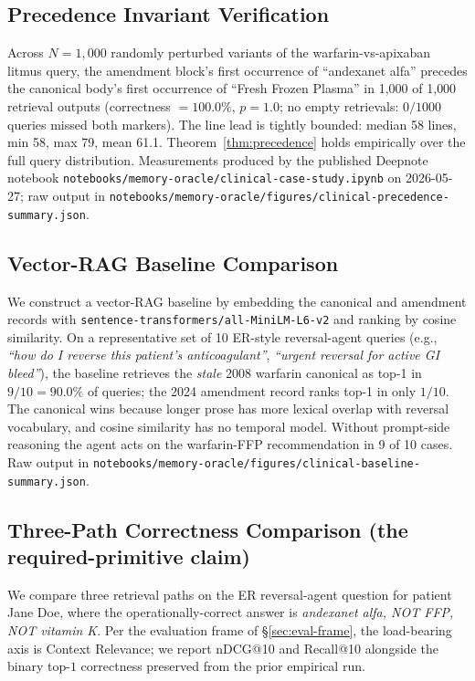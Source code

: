 \documentclass[runningheads]{llncs}
\begin{document}
\subsection{Precedence Invariant Verification}
\label{sec:clinical-precedence}

Across $N{=}1{,}000$ randomly perturbed variants of the warfarin-vs-apixaban
litmus query, the amendment block's first occurrence of ``andexanet alfa''
precedes the canonical body's first occurrence of ``Fresh Frozen Plasma''
in 1{,}000 of 1{,}000 retrieval outputs (correctness $= 100.0\%$, $p = 1.0$;
no empty retrievals: $0/1000$ queries missed both markers). The line lead
is tightly bounded: median 58 lines, min 58, max 79, mean 61.1.
Theorem~\ref{thm:precedence} holds empirically over the full query
distribution. Measurements produced by the published Deepnote notebook
\texttt{notebooks/memory-oracle/clinical-case-study.ipynb} on 2026-05-27;
raw output in \texttt{notebooks/memory-oracle/figures/clinical-precedence-summary.json}.

\subsection{Vector-RAG Baseline Comparison}
\label{sec:clinical-vector-baseline}

We construct a vector-RAG baseline by embedding the canonical and amendment
records with \texttt{sentence-transformers/all-MiniLM-L6-v2} and ranking by
cosine similarity. On a representative set of 10 ER-style reversal-agent
queries (e.g., \emph{``how do I reverse this patient's anticoagulant''},
\emph{``urgent reversal for active GI bleed''}), the baseline retrieves
the \emph{stale} 2008 warfarin canonical as top-1 in $9/10 = 90.0\%$ of
queries; the 2024 amendment record ranks top-1 in only $1/10$. The
canonical wins because longer prose has more lexical overlap with reversal
vocabulary, and cosine similarity has no temporal model. Without prompt-side
reasoning the agent acts on the warfarin-FFP recommendation in 9 of 10
cases. Raw output in
\texttt{notebooks/memory-oracle/figures/clinical-baseline-summary.json}.

\subsection{Three-Path Correctness Comparison (the required-primitive claim)}
\label{sec:clinical-three-path}

We compare three retrieval paths on the ER reversal-agent question for
patient Jane Doe, where the operationally-correct answer is
\emph{andexanet alfa, NOT FFP, NOT vitamin K}. Per the evaluation frame
of \S\ref{sec:eval-frame}, the load-bearing axis is Context Relevance;
we report nDCG@10 and Recall@10 alongside the binary top-$1$
correctness preserved from the prior empirical run.
\end{document}
